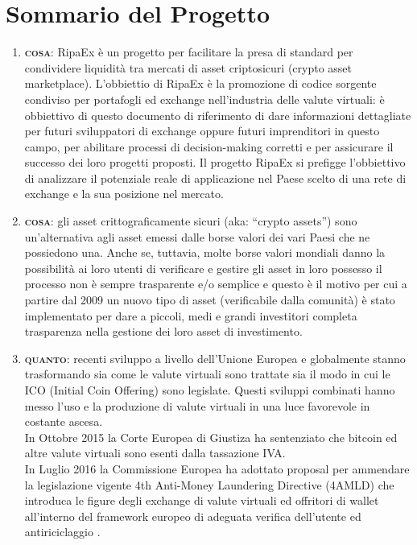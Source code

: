 \documentclass[11pt,fleqn]{book} %
\begin{document}
\section{Sommario del Progetto}
\begin{enumerate}
	\item \textbf{\textsc{cosa}}: RipaEx è un progetto per facilitare la presa di standard per condividere liquidità tra mercati di asset
	criptosicuri (crypto asset marketplace).
	L'obbiettio di RipaEx è la promozione di codice sorgente condiviso per portafogli ed exchange nell'industria delle valute
	virtuali: è obbiettivo di questo documento di riferimento di dare informazioni dettagliate per futuri
	sviluppatori di exchange oppure futuri imprenditori in questo campo, per abilitare processi di decision-making corretti e per 
	assicurare il successo dei loro progetti proposti.
	Il progetto RipaEx si prefigge l'obbiettivo di analizzare il potenziale reale di applicazione nel Paese scelto 
	di una rete di exchange e la sua posizione nel mercato.
	\item \textbf{\textsc{cosa}}: gli asset crittograficamente sicuri (aka: ``crypto assets'') sono un'alternativa agli asset emessi dalle borse
	valori dei vari Paesi che ne possiedono una. Anche se, tuttavia, molte borse valori mondiali danno la possibilità ai loro 
	utenti di verificare e gestire gli asset in loro possesso il processo non è sempre trasparente e/o semplice e questo è il motivo 
	per cui a partire dal 2009 \cite{bitcoin} un nuovo tipo di asset (verificabile dalla comunità) è stato implementato
	per dare a piccoli, medi e grandi investitori completa trasparenza nella gestione dei loro asset di investimento.
	\item \textbf{\textsc{quanto}}: recenti sviluppo a livello dell'Unione Europea e globalmente stanno trasformando sia come le valute virtuali
	sono trattate sia il modo in cui le ICO (Initial Coin Offering) sono legislate. Questi sviluppi combinati hanno messo
	l'uso e la produzione di valute virtuali in una luce favorevole in costante ascesa. \\
	In Ottobre 2015 la Corte Europea di Giustiza ha sentenziato che bitcoin ed altre valute virtuali sono esenti dalla tassazione IVA. \\
	In Luglio 2016 la Commissione Europea ha adottato proposal per ammendare la legislazione vigente 4th Anti-Money Laundering Directive (4AMLD) 
	che introduca le figure degli exchange di valute virtuali ed offritori di wallet all'interno del framework europeo di adeguata verifica
	dell'utente ed antiriciclaggio \cite{EUAMLCrypto}.\\

\end{enumerate}
\end{document}
